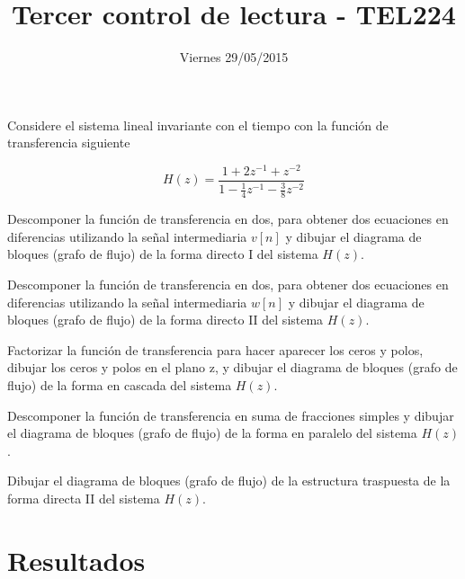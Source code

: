 \documentclass[addpoints]{exam}
\begin{document}
\headrule

\title{Tercer control de lectura - TEL224}
\date{Viernes 29/05/2015}
\maketitle

\vspace{0.1in}
\vspace{0.1in}

Considere el sistema lineal invariante con el tiempo con la función de transferencia siguiente

$$H(z) = \frac{1 + 2 z^{-1} + z^{-2}}{1 - \frac{1}{4} z^{-1} -\frac{3}{8} z^{-2}}$$

\begin{questions}

\question[20]

Descomponer la función de transferencia en dos, para obtener dos ecuaciones en diferencias utilizando la señal intermediaria \(v[n]\) y dibujar el diagrama de bloques (grafo de flujo) de la forma directo I del sistema \(H(z)\).

\question[20]

Descomponer la función de transferencia en dos, para obtener dos ecuaciones en diferencias utilizando la señal intermediaria \(w[n]\) y dibujar el diagrama de bloques (grafo de flujo) de la forma directo II del sistema \(H(z)\).

\newpage
\question[20]

Factorizar la función de transferencia para hacer aparecer los ceros y polos, dibujar los ceros y polos en el plano z, y dibujar el diagrama de bloques (grafo de flujo) de la forma en cascada del sistema \(H(z)\).

\question[20]

Descomponer la función de transferencia en suma de fracciones simples y dibujar el diagrama de bloques (grafo de flujo) de la forma en paralelo del sistema \(H(z)\).

\newpage
\question[20]

Dibujar el diagrama de bloques (grafo de flujo) de la estructura traspuesta de la forma directa II del sistema \(H(z)\).


\end{questions}

\section*{Resultados}

\begin{center}
\gradetable[v][questions]
\end{center}

\footrule
{}
\end{document}
